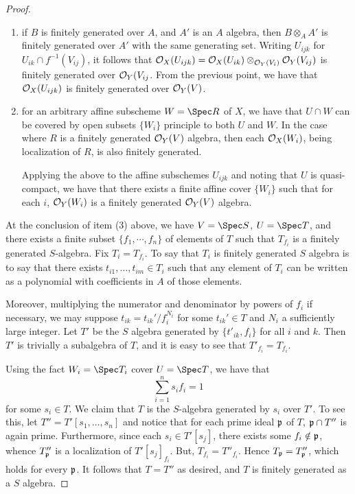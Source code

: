 \begin{proof}
\begin{enumerate}
\item if $B$ is finitely generated over $A$, and $A'$ is an 
$A$ algebra, then $B \otimes_A A'$ is finitely generated over
$A'$ with the same generating set. Writing $U_{ijk}$ for $U_{ik} 
\cap f^{-1}(V_{ij})$, it follows that $\mathcal{O}_X(U_{ijk}) = \mathcal{O}_X(U_{ik})
\otimes_{\mathcal{O}_Y(V_i)} \mathcal{O}_Y(V_{ij})$ is finitely generated over
$\mathcal{O}_Y(V_{ij}$. From the previous point, we have that
$\mathcal{O}_X(U_{ijk})$ is finitely generated over $\mathcal{O}_Y(V)$.

\item for an arbitrary affine subscheme $W = \Spec R$ of $X$, we 
have that $U \cap W$ can be covered by open subsets $\{W_i\}$ 
principle to both $U$ and $W$. In the case where $R$ is a finitely
generated $\mathcal{O}_Y(V)$ algebra, then each $\mathcal{O}_X(W_i)$, being 
localization of $R$, is also finitely generated. 

Applying the above to the affine subschemes $U_{ijk}$ and noting
that $U$ is quasi-compact, we have that there exists a finite
affine cover $\{W_i\}$ such that for each $i$, $\mathcal{O}_Y(W_i)$ is a
finitely generated $\mathcal{O}_Y(V)$ algebra.
\end{enumerate}

At the conclusion of item (3) above, we have $V = \Spec S$,
$U = \Spec T$, and there exists a finite subset $\{f_1,
\cdots, f_n\}$ of elements of $T$ such that $T_{f_i}$ is a
finitely generated $S$-algebra. Fix $T_i = T_{f_i}$. To say
that $T_i$ is finitely generated $S$ algebra is to say that
there exists $t_{i1},\dots,t_{im} \in T_i$ such that any element 
of $T_i$ can be written as a polynomial with coefficients in $A$ 
of those elements. 

Moreover, multiplying the numerator and denominator by powers of 
$f_i$ if necessary, we may suppose $t_{ik} = t_{ik}'/f_i^{N_i}$ for 
some $t_{ik}' \in T$ and $N_i$ a sufficiently large integer. Let
$T'$ be the $S$ algebra generated by $\{t'_{ik}, f_i\}$ for all 
$i$ and $k$. Then $T'$ is trivially a subalgebra of $T$, and it is 
easy to see that $T'_{f_i} = T_{f_i}$.

Using the fact $W_i = \Spec T_i$ cover $U = \Spec T$, we have that
\[
\sum_{i = 1}^n s_if_i = 1
\]
for some $s_i \in T$. We claim that $T$ is the $S$-algebra 
generated by $s_i$ over $T'$. To see this, let $T'' = T'[s_1, 
\dots,s_n]$ and notice that for each prime ideal $\mathfrak{p}$ of 
$T$, $\mathfrak{p} \cap T''$ is again prime. Furthermore, since 
each $s_i \in T'[s_j]$, there exists some $f_i \notin \mathfrak{p}$, 
whence $T''_{\mathfrak{p}}$ is a localization of $T'[s_j]_{f_i}$. 
But, $T_{f_i} = T''_{f_i}$. Hence $T_{\mathfrak{p}} = T''_{\mathfrak{p}}$,
which holds for every $\mathfrak{p}$. It follows that $T = T''$ as
desired, and $T$ is finitely generated as a $S$ algebra.
\end{proof}

